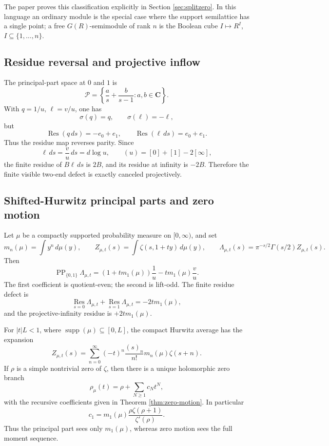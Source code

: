 \documentclass[11pt]{article}
\newcommand{\C}{\mathbf C}
\newcommand{\PP}{\operatorname{PP}}
\newcommand{\Res}{\operatorname*{Res}}
\newcommand{\supp}{\operatorname{supp}}
\theoremstyle{plain}
\theoremstyle{definition}
\numberwithin{equation}{section}
\begin{document}
The paper proves this classification explicitly in Section \ref{sec:splitzero}.  In this language an ordinary module is the special case where the support semilattice has a single point; a free \(G(R)\)-semimodule of rank \(n\) is the Boolean cube \(I\mapsto R^I\), \(I\subseteq\{1,\ldots,n\}\).

\subsection{Residue reversal and projective inflow}

The principal-part space at \(0\) and \(1\) is
\[
 \mathcal P=\left\{\frac as+\frac b{s-1}:a,b\in\C\right\}.
\]
With \(q=1/u\), \(\ell=v/u\), one has
\[
 \sigma(q)=q,
 \qquad
 \sigma(\ell)=-\ell,
\]
but
\[
 \Res(q\,ds)= -e_0+e_1,
 \qquad
 \Res(\ell\,ds)=e_0+e_1.
\]
Thus the residue map reverses parity.  Since
\[
 \ell\,ds=\frac vu\,ds=d\log u,
 \qquad
 (u)=[0]+[1]-2[\infty],
\]
the finite residue of \(B\ell\,ds\) is \(2B\), and its residue at infinity is \(-2B\).  Therefore the finite visible two-end defect is exactly canceled projectively.

\subsection{Shifted-Hurwitz principal parts and zero motion}

Let \(\mu\) be a compactly supported probability measure on \([0,\infty)\), and set
\[
 m_n(\mu)=\int y^n\,d\mu(y),
 \qquad
 Z_{\mu,t}(s)=\int \zeta(s,1+ty)\,d\mu(y),
 \qquad
 \Lambda_{\mu,t}(s)=\pi^{-s/2}\Gamma(s/2)Z_{\mu,t}(s).
\]
Then
\[
 \PP_{\{0,1\}}\Lambda_{\mu,t}=
 (1+tm_1(\mu))\frac1u-tm_1(\mu)\frac vu.
\]
The first coefficient is quotient-even; the second is lift-odd.  The finite residue defect is
\[
 \Res_{s=0}\Lambda_{\mu,t}+\Res_{s=1}\Lambda_{\mu,t}=-2tm_1(\mu),
\]
and the projective-infinity residue is \(+2tm_1(\mu)\).

For \(|t|L<1\), where \(\supp(\mu)\subseteq[0,L]\), the compact Hurwitz average has the expansion
\[
 Z_{\mu,t}(s)=\sum_{n=0}^\infty (-t)^n\frac{(s)_n}{n!}m_n(\mu)\zeta(s+n).
\]
If \(\rho\) is a simple nontrivial zero of \(\zeta\), then there is a unique holomorphic zero branch
\[
 \rho_\mu(t)=\rho+\sum_{N\ge1}c_Nt^N,
\]
with the recursive coefficients given in Theorem \ref{thm:zero-motion}.  In particular
\[
 c_1=m_1(\mu)\frac{\rho\zeta(\rho+1)}{\zeta'(\rho)}.
\]
Thus the principal part sees only \(m_1(\mu)\), whereas zero motion sees the full moment sequence.
\end{document}
